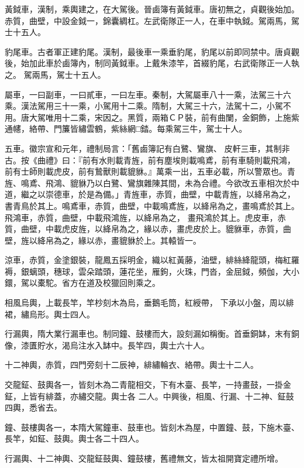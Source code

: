\begin{pinyinscope}
 黃鉞車，漢制，乘輿建之，在大駕後。晉鹵簿有黃鉞車。唐初無之，貞觀後始加。赤質，曲壁，中設金鉞一，錦囊綢杠。左武衛隊正一人，在車中執鉞。駕兩馬，駕士十五人。



 豹尾車。古者軍正建豹尾。漢制，最後車一乘垂豹尾，豹尾以前即同禁中。唐貞觀後，始加此車於鹵簿內，制同黃鉞車。上戴朱漆竿，首綴豹尾，右武衛隊正一人執之。
 駕兩馬，駕士十五人。



 屬車，一曰副車，一曰貳車，一曰左車。秦制，大駕屬車八十一乘，法駕三十六乘。漢法駕用三十一乘，小駕用十二乘。隋制，大駕三十六，法駕十二，小駕不用。唐大駕唯用十二乘，宋因之。黑質，兩箱ＣＰ裝，前有曲闌，金銅飾，上施紫通幰，絡帶、門簾皆繡雲鶴，紫絲網□錔。每乘駕三牛，駕士十人。



 五車。徽宗宣和元年，禮制局言：「舊鹵簿記有白鷺、鸞旗、
 皮軒三車，其制非古。按《曲禮》曰：『前有水則載青旌，前有塵埃則載鳴鳶，前有車騎則載飛鴻，前有士師則載虎皮，前有鷙獸則載貔貅。』萬乘一出，五車必載，所以警眾也。青旌、鳴鳶、飛鴻、貔貅乃以白鷺、鸞旗雜陳其間，未為合禮。今欲改五車相次於中道，繼之以崇德車，於是為備。」青旌車，赤質，曲壁，中載青旌，以絳帛為之，書青鳥於其上。鳴鳶車，赤質，曲壁，中載鳴鳶旌，以絳帛為之，畫鳴鳶於其上。飛鴻車，赤質，曲壁，中載飛鴻旌，以絳帛為之，
 畫飛鴻於其上。虎皮車，赤質，曲壁，中載虎皮旌，以絳帛為之，緣以赤，畫虎皮於上。貔貅車，赤質，曲壁，旌以絳帛為之，緣以赤，畫貔貅於上。其轅皆一。



 涼車，赤質，金塗銀裝，龍鳳五採明金，織以紅黃藤，油壁，緋絲絳龍頭，梅紅羅褥，銀螭頭，穗球，雲朵踏頭，蓮花坐，雁鉤，火珠，門沓，金屈鉞，頻伽，大小鐶，駕以橐駝。省方在道及校獵回則乘之。



 相風烏輿，上載長竿，竿杪刻木為烏，垂鵝毛筒，紅綬帶，
 下承以小盤，周以緋裙，繡烏形。輿士四人。



 行漏輿，隋大業行漏車也。制同鐘、鼓樓而大，設刻漏如稱衡。首垂銅缽，末有銅像，漆匱貯水，渴烏注水入缽中。長竿四，輿士六十人。



 十二神輿，赤質，四門旁刻十二辰神，緋繡輪衣、絡帶。輿士十二人。



 交龍鉦、鼓輿各一，皆刻木為二青龍相交，下有木臺、長竿，一持畫鼓，一掛金鉦，上皆有緋蓋，亦繡交龍。輿士各
 二人。中興後，相風、行漏、十二神、鉦鼓四輿，悉省去。



 鐘、鼓樓輿各一，本隋大駕鐘車、鼓車也。皆刻木為屋，中置鐘、鼓，下施木臺、長竿，如鉦、鼓輿。輿士各二十四人。



 行漏輿、十二神輿、交龍鉦鼓輿、鐘鼓樓，舊禮無文，皆太祖開寶定禮所增。



\end{pinyinscope}